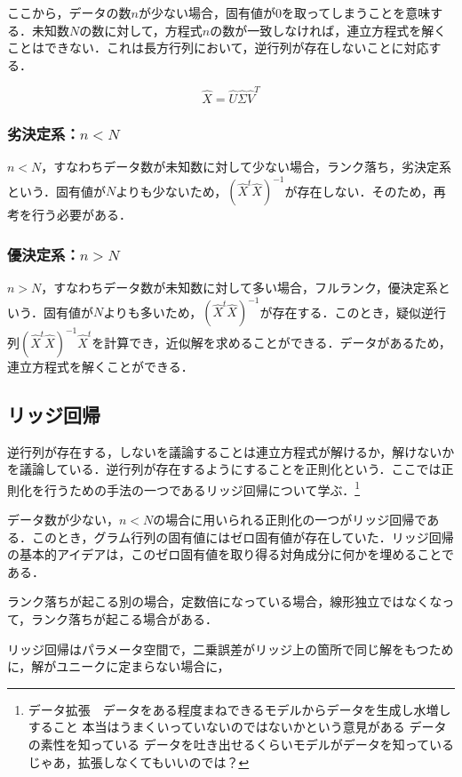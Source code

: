 ここから，データの数$n$が少ない場合，固有値が$0$を取ってしまうことを意味する．未知数$N$の数に対して，方程式$n$の数が一致しなければ，連立方程式を解くことはできない．これは長方行列において，逆行列が存在しないことに対応する．

\begin{equation}
    \hat{X} = \hat{U}\hat{\Sigma}\hat{V}^T
\end{equation}


\subsubsection{劣決定系：$n < N$}
$n < N$，すなわちデータ数が未知数に対して少ない場合，ランク落ち，劣決定系という．固有値が$N$よりも少ないため，$(\hat{X}^t\hat{X})^{-1}$が存在しない．そのため，再考を行う必要がある．


\subsubsection{優決定系：$n > N$}
$n > N$，すなわちデータ数が未知数に対して多い場合，フルランク，優決定系という．固有値が$N$よりも多いため，$(\hat{X}^t\hat{X})^{-1}$が存在する．このとき，疑似逆行列$(\hat{X}^t\hat{X})^{-1}
\hat{X}^t$を計算でき，近似解を求めることができる．データがあるため，連立方程式を解くことができる．


\subsection{リッジ回帰}
逆行列が存在する，しないを議論することは連立方程式が解けるか，解けないかを議論している．逆行列が存在するようにすることを正則化という．ここでは正則化を行うための手法の一つであるリッジ回帰について学ぶ．\footnote{
    データ拡張　データをある程度まねできるモデルからデータを生成し水増しすること
    本当はうまくいっていないのではないかという意見がある
    データの素性を知っている
    データを吐き出せるくらいモデルがデータを知っている
    じゃあ，拡張しなくてもいいのでは？
}

データ数が少ない，$n < N$の場合に用いられる正則化の一つがリッジ回帰である．このとき，グラム行列の固有値にはゼロ固有値が存在していた．リッジ回帰の基本的アイデアは，このゼロ固有値を取り得る対角成分に何かを埋めることである．

ランク落ちが起こる別の場合，定数倍になっている場合，線形独立ではなくなって，ランク落ちが起こる場合がある．

リッジ回帰はパラメータ空間で，二乗誤差がリッジ上の箇所で同じ解をもつために，解がユニークに定まらない場合に，

